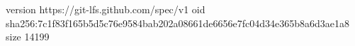 version https://git-lfs.github.com/spec/v1
oid sha256:7c1f83f165b5d5c76e9584bab202a08661de6656e7fc04d34e365b8a6d3ae1a8
size 14199
